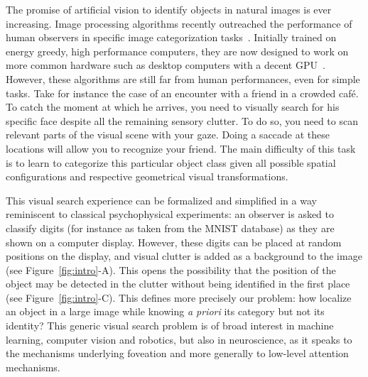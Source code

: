 \ICANN 
The promise of artificial vision to identify objects in natural images is ever increasing. 
\fi
Image processing algorithms recently outreached the performance of human observers in specific image categorization tasks~\citep{He15}. Initially trained on energy greedy, high performance computers, they are now designed to work on more common hardware such as desktop computers with a decent GPU~\citep{Sandler18}. However, these algorithms are still far from human performances, even for simple tasks. Take for instance the case of an encounter with a friend in a crowded café. To catch the moment at which he arrives, you need to visually search for his specific face despite all the remaining sensory clutter. To do so, you need to scan relevant parts of the visual scene with your gaze. Doing a saccade at these locations  will allow you to recognize your friend. 
\ICANN The main difficulty of this task is to learn to categorize this particular object class given all possible spatial configurations and respective geometrical visual transformations. 
\fi

This visual search experience can be formalized and simplified in a way reminiscent to classical psychophysical experiments: an observer is asked to classify digits (for instance as taken from the MNIST database) as they are shown on a computer display. However, these digits can be placed at random positions on the display, and visual clutter is added as a background to the image (see Figure~\ref{fig:intro}-A). This opens the possibility that the position of the object may be detected in the clutter without being identified in the first place  (see Figure~\ref{fig:intro}-C). This defines more precisely our problem: how localize an object in a large image while knowing \emph{a priori} its category but not its identity? This generic visual search problem is of broad interest in machine learning, computer vision and robotics, but also in neuroscience, as it speaks to the mechanisms underlying foveation and more generally to low-level attention mechanisms.


